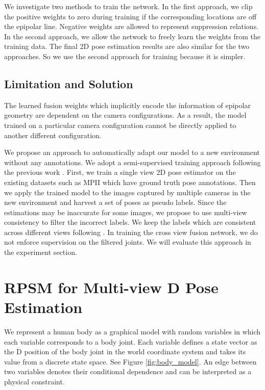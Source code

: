 \documentclass[10pt,twocolumn,letterpaper]{article}
\begin{document}
We investigate two methods to train the network. In the first approach, we clip the positive weights to zero during training if the corresponding locations are off the epipolar line. Negative weights are allowed to represent suppression relations. In the second approach, we allow the network to freely learn the weights from the training data. The final 2D pose estimation results are also similar for the two approaches. So we use the second approach for training because it is simpler.


\subsection{Limitation and Solution}
The learned fusion weights which implicitly encode the information of epipolar geometry are dependent on the camera configurations. As a result, the model trained on a particular camera configuration cannot be directly applied to another different configuration. 

We propose an approach to automatically adapt our model to a new environment without any annotations. 
We adopt a semi-supervised training approach following the previous work \cite{simon2017hand}. First, we train a single view 2D pose estimator \cite{simplebaselines} on the existing datasets such as MPII which have ground truth pose annotations. Then we apply the trained model to the images captured by multiple cameras in the new environment and harvest a set of poses as pseudo labels. Since the estimations may be inaccurate for some images, we propose to use multi-view consistency to filter the incorrect labels. We keep the labels which are consistent across different views following \cite{simon2017hand}. In training the cross view fusion network, we do not enforce supervision on the filtered joints. We will evaluate this approach in the experiment section.

\section{RPSM for Multi-view D Pose Estimation}
We represent a human body as a graphical model with  random variables  in which each variable corresponds to a body joint. Each variable  defines a state vector  as the D position of the body joint in the world coordinate system and takes its value from a discrete state space. See Figure \ref{fig:body_model}. An edge between two variables denotes their conditional dependence  and can be interpreted as a physical constraint. 
\end{document}
